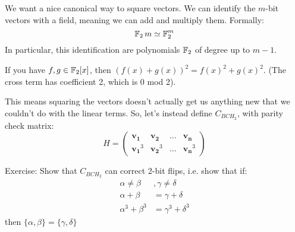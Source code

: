 We want a nice canonical way to square vectors. We can identify the $m$-bit vectors with a field, meaning we can add and multiply them.
Formally:
\[ \operatorname{\mathbb{F}}_2 m \simeq \operatorname{\mathbb{F}}_2^m \]
In particular, this identification are polynomials $\operatorname{\mathbb{F}}_2$ of degree up to $m - 1$.

\begin{note}
    If you have $f, g \in \operatorname{\mathbb{F}}_2[x]$, then $(f(x) + g(x))^2 = f(x)^2 + g(x)^2$. (The cross term has coefficient 2, which is 0 mod 2).
\end{note}

This means squaring the vectors doesn't actually get us anything new that we couldn't do with the linear terms. So, let's instead define
$C_{BCH_2}$, with parity check matrix:
\[ H = \begin{pmatrix}
    \mathbf{v_1} & \mathbf{v_2} & \dots & \mathbf{v_n} \\
    \mathbf{v_1}^3 & \mathbf{v_2}^3 & \dots & \mathbf{v_n}^3
\end{pmatrix}\]

Exercise: Show that $C_{BCH_2}$ can correct 2-bit flips, i.e. show that if:
\begin{align*} 
    \alpha \neq \beta &, \gamma \neq \delta \\
    \alpha + \beta &= \gamma + \delta \\
    \alpha^3 + \beta^3 &= \gamma^3 + \delta^3
\end{align*}
then $\{\alpha, \beta\} = \{\gamma, \delta\}$